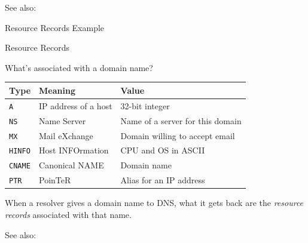 See also: 

\begin{frame}{Resource Records Example}
  \begin{center}
  \end{center}
\end{frame}

\begin{frame}{Resource Records}
  \begin{iblock}{What's associated with a domain name?}
    \begin{small}
    \begin{tabular}{@{}llp{}@{}}\toprule
      \textbf{Type}&\textbf{Meaning}&\textbf{Value}\\\midrule
      \texttt{A}&IP address of a host&32-bit integer\\[1ex]
      \texttt{NS}&Name Server&Name of a server for this domain\\[1ex]
      \texttt{MX}&Mail eXchange&Domain willing to accept email\\[1ex]
      \texttt{HINFO}&Host INFOrmation&CPU and OS in ASCII\\[1ex]
      \texttt{CNAME}&Canonical NAME&Domain name\\[1ex]
      \texttt{PTR}&PoinTeR&Alias for an IP address\\\bottomrule
    \end{tabular}
    \end{small}
  \end{iblock}
  When a resolver gives a domain name to DNS, what it gets back are the \emph{resource records}
  associated with that name.
\end{frame}

See also: 

